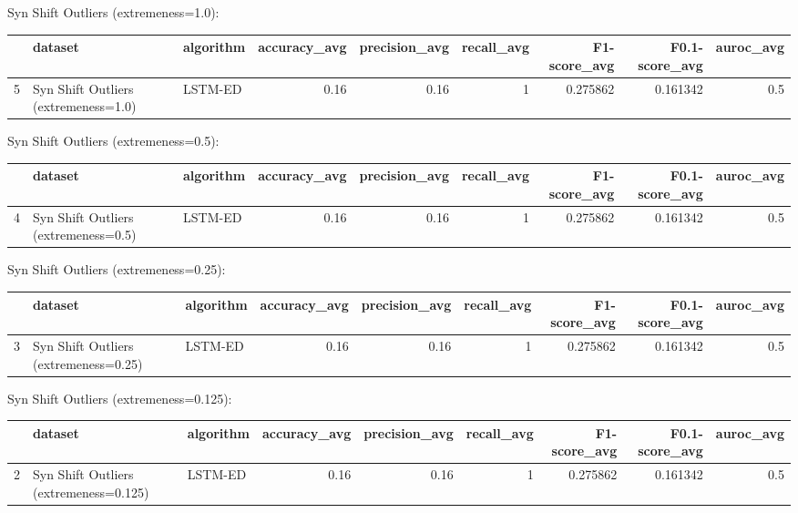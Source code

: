 Syn Shift Outliers (extremeness=1.0):

\begin{tabular}{rllrrrrrr}
\hline
    & dataset                              & algorithm   &   accuracy\_avg &   precision\_avg &   recall\_avg &   F1-score\_avg &   F0.1-score\_avg &   auroc\_avg \\
\hline
  5 & Syn Shift Outliers (extremeness=1.0) & LSTM-ED     &           0.16 &            0.16 &            1 &       0.275862 &         0.161342 &         0.5 \\
\hline
\end{tabular}

Syn Shift Outliers (extremeness=0.5):

\begin{tabular}{rllrrrrrr}
\hline
    & dataset                              & algorithm   &   accuracy\_avg &   precision\_avg &   recall\_avg &   F1-score\_avg &   F0.1-score\_avg &   auroc\_avg \\
\hline
  4 & Syn Shift Outliers (extremeness=0.5) & LSTM-ED     &           0.16 &            0.16 &            1 &       0.275862 &         0.161342 &         0.5 \\
\hline
\end{tabular}

Syn Shift Outliers (extremeness=0.25):

\begin{tabular}{rllrrrrrr}
\hline
    & dataset                               & algorithm   &   accuracy\_avg &   precision\_avg &   recall\_avg &   F1-score\_avg &   F0.1-score\_avg &   auroc\_avg \\
\hline
  3 & Syn Shift Outliers (extremeness=0.25) & LSTM-ED     &           0.16 &            0.16 &            1 &       0.275862 &         0.161342 &         0.5 \\
\hline
\end{tabular}

Syn Shift Outliers (extremeness=0.125):

\begin{tabular}{rllrrrrrr}
\hline
    & dataset                                & algorithm   &   accuracy\_avg &   precision\_avg &   recall\_avg &   F1-score\_avg &   F0.1-score\_avg &   auroc\_avg \\
\hline
  2 & Syn Shift Outliers (extremeness=0.125) & LSTM-ED     &           0.16 &            0.16 &            1 &       0.275862 &         0.161342 &         0.5 \\
\hline
\end{tabular}

